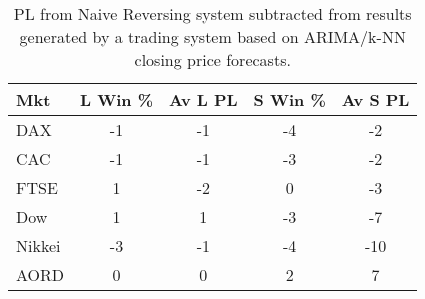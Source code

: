 \begin{table}[ht]
\centering
\caption[ARIMA/k-NN closing price system results minus Naive Reversing results]{PL from Naive Reversing system subtracted from results generated by a trading system based on ARIMA/k-NN closing price forecasts.} 
\label{tab:chp_ts:pred_close_arima_knn_sys1_diff}
\begin{tabular}{lcccc}
  \toprule Mkt & L Win \% & Av L PL & S Win \% & Av S PL \\ 
  \midrule DAX & -1 & -1 & -4 & -2 \\ 
  CAC & -1 & -1 & -3 & -2 \\ 
  FTSE & 1 & -2 & 0 & -3 \\ 
  Dow & 1 & 1 & -3 & -7 \\ 
  Nikkei & -3 & -1 & -4 & -10 \\ 
  AORD & 0 & 0 & 2 & 7 \\ 
   \bottomrule \end{tabular}
\end{table}
